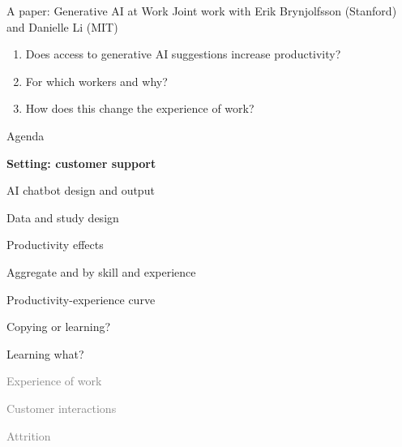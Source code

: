 \documentclass[aspectratio=169,t,11pt,table]{beamer}
\begin{document}
\begin{frame}{A paper: Generative AI at Work} {Joint work with Erik Brynjolfsson (Stanford) and Danielle Li (MIT)}
\begin{enumerate}
    \item Does access to generative AI suggestions increase productivity? 
    
      \medskip
    \item For which workers and why? 

    \medskip
    \item How does this change the experience of work? 
    \medskip
\end{enumerate}
\medskip 
{}
\end{frame}



\begin{frame}{Agenda}
\be
\item \textbf{Setting: customer support}
\bi 
\item AI chatbot design and output
\ei 
\medskip
\item Data and study design
\medskip 
\item Productivity effects
\bi
\item Aggregate and by skill and experience
\item Productivity-experience curve
\item Copying or learning?
\item Learning what?
\ei 
\medskip
\item \textcolor{gray}{Experience of work}
\bi 
\item \textcolor{gray}{Customer interactions}
\item \textcolor{gray}{Attrition}
\ei 
\ee 
\end{frame}
\end{document}
